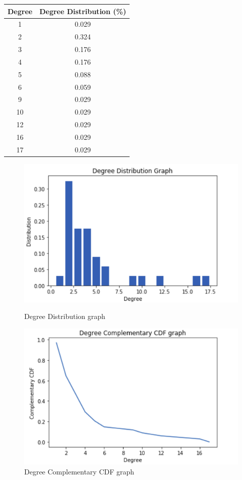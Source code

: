 \documentclass[a4paper,12pt]{article}
\begin{document}
\begin{table}[h]
\centering
\begin{tabular}{c|c}
Degree & Degree Distribution (\%)\\
\hline
1 & 0.029\\
2 & 0.324\\
3 & 0.176\\
4 & 0.176\\
5 & 0.088\\
6 & 0.059\\
9 & 0.029\\
10 & 0.029\\
12 & 0.029\\
16 & 0.029\\
17 & 0.029
\end{tabular}
\end{table}
\begin{figure}[!ht]
    \centering
    \begin{minipage}{0.45\textwidth}
        \centering
            \includegraphics[scale=0.4]{graph_degree_distribution.png}
            \caption{Degree Distribution graph}
    \end{minipage}\hfill
    \begin{minipage}{0.45\textwidth}
        \centering
            \includegraphics[scale=0.4]{graph_ccdf.png}
            \caption{Degree Complementary CDF graph}
    \end{minipage}
\end{figure}
\clearpage
\end{document}
